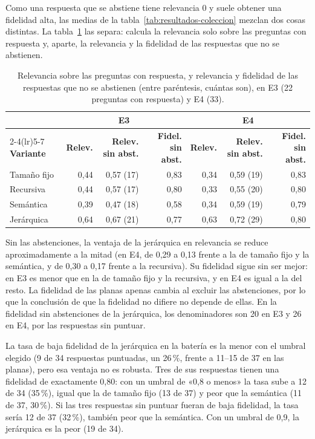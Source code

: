 Como una respuesta que se abstiene tiene relevancia 0 y suele obtener una fidelidad alta, las medias de la tabla~\ref{tab:resultados-coleccion} mezclan dos cosas distintas. La tabla~\ref{tab:sin-abstenciones} las separa: calcula la relevancia solo sobre las preguntas con respuesta y, aparte, la relevancia y la fidelidad de las respuestas que no se abstienen.

\begin{table}[htbp]
\centering\small
\caption[Relevancia y fidelidad con y sin abstenciones]{Relevancia sobre las preguntas con respuesta, y relevancia y fidelidad de las respuestas que no se abstienen (entre paréntesis, cuántas son), en E3 (22 preguntas con respuesta) y E4 (33).}
\label{tab:sin-abstenciones}
\begin{tabular}{@{}l rrr rrr@{}}
\toprule
& \multicolumn{3}{c}{\textbf{E3}} & \multicolumn{3}{c}{\textbf{E4}} \\
\cmidrule(lr){2-4}\cmidrule(lr){5-7}
\textbf{Variante} & \textbf{Relev.} & \textbf{Relev. sin abst.} & \textbf{Fidel. sin abst.} & \textbf{Relev.} & \textbf{Relev. sin abst.} & \textbf{Fidel. sin abst.} \\
\midrule
Tamaño fijo & 0,44 & 0,57 (17) & 0,83 & 0,34 & 0,59 (19) & 0,83 \\
Recursiva   & 0,44 & 0,57 (17) & 0,80 & 0,33 & 0,55 (20) & 0,80 \\
Semántica   & 0,39 & 0,47 (18) & 0,58 & 0,34 & 0,59 (19) & 0,79 \\
Jerárquica  & 0,64 & 0,67 (21) & 0,77 & 0,63 & 0,72 (29) & 0,80 \\
\bottomrule
\end{tabular}
\end{table}

Sin las abstenciones, la ventaja de la jerárquica en relevancia se reduce aproximadamente a la mitad (en E4, de 0,29 a 0,13 frente a la de tamaño fijo y la semántica, y de 0,30 a 0,17 frente a la recursiva). Su fidelidad sigue sin ser mejor: en E3 es menor que en la de tamaño fijo y la recursiva, y en E4 es igual a la del resto. La fidelidad de las planas apenas cambia al excluir las abstenciones, por lo que la conclusión de que la fidelidad no difiere no depende de ellas. En la fidelidad sin abstenciones de la jerárquica, los denominadores son 20 en E3 y 26 en E4, por las respuestas sin puntuar.

La tasa de baja fidelidad de la jerárquica en la batería es la menor con el umbral elegido (9 de 34 respuestas puntuadas, un 26\,\%, frente a 11--15 de 37 en las planas), pero esa ventaja no es robusta. Tres de sus respuestas tienen una fidelidad de exactamente 0,80: con un umbral de «0,8 o menos» la tasa sube a 12 de 34 (35\,\%), igual que la de tamaño fijo (13 de 37) y peor que la semántica (11 de 37, 30\,\%). Si las tres respuestas sin puntuar fueran de baja fidelidad, la tasa sería 12 de 37 (32\,\%), también peor que la semántica. Con un umbral de 0,9, la jerárquica es la peor (19 de 34).

